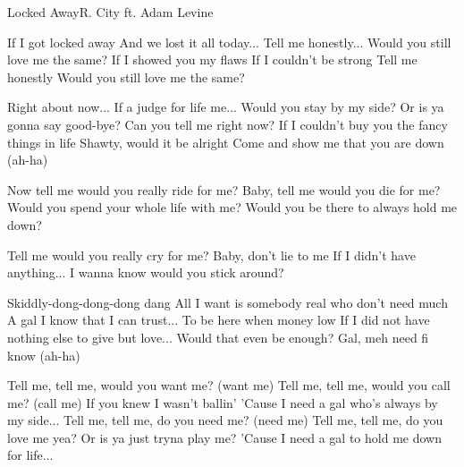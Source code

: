 \begin{Song}{Locked Away}{R. City ft. Adam Levine}
\begin{multicols}{2}

\begin{Chorus}
If I got locked away
And we lost it all today...
Tell me honestly...
Would you still love me the same?
If I showed you my flaws
If I couldn't be strong
Tell me honestly
Would you still love me the same?
\end{Chorus}
\espaceInterStrophe

\begin{Verse}
Right about now...
If a judge for life me...
Would you stay by my side?
Or is ya gonna say good-bye?
Can you tell me right now?
If I couldn't buy you the fancy things in life
Shawty, would it be alright
Come and show me that you are down (ah-ha)
\end{Verse}
\espaceInterStrophe

\begin{PreChorus}
Now tell me would you really ride for me?
Baby, tell me would you die for me?
Would you spend your whole life with me?
Would you be there to always hold me down?

Tell me would you really cry for me?
Baby, don't lie to me
If I didn't have anything...
I wanna know would you stick around?
\end{PreChorus}
\espaceInterStrophe

\tochorus
\espaceInterStrophe

\begin{Verse}
Skiddly-dong-dong-dong dang
All I want is somebody real who don't need much
A gal I know that I can trust...
To be here when money low
If I did not have nothing else to give but love...
Would that even be enough?
Gal, meh need fi know (ah-ha)
\end{Verse}
\espaceInterStrophe

\espaceInterStrophe

\tochorus
\espaceInterStrophe

\begin{Bridge}
Tell me, tell me, would you want me? (want me)
Tell me, tell me, would you call me? (call me)
If you knew I wasn't ballin'
'Cause I need a gal who's always by my side...
Tell me, tell me, do you need me? (need me)
Tell me, tell me, do you love me yea?
Or is ya just tryna play me?
'Cause I need a gal to hold me down for life...
\end{Bridge}
\espaceInterStrophe


\end{multicols}
\end{Song}
